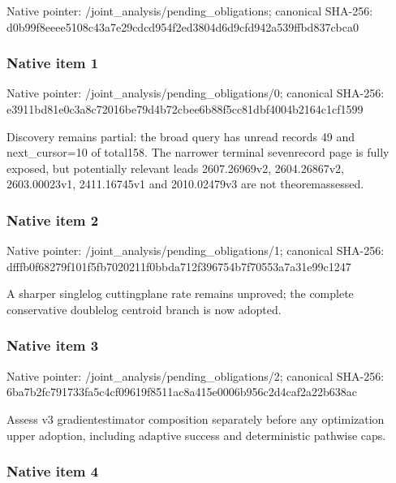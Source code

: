 \documentclass[10pt,a4paper]{article}
\begin{document}
Native pointer: /joint\_analysis/pending\_obligations; canonical SHA-256: d0b99f8eeee5108c43a7e29c\allowbreak{}dcd954f2ed3804d6d9cfd942\allowbreak{}a539ffbd837cbca0



\subsubsection{Native item 1}


Native pointer: /joint\_analysis/pending\_obligations/0; canonical SHA-256: e3911bd81e0c3a8c72016be7\allowbreak{}9d4b72cbee6b88f5cc81dbf4\allowbreak{}004b2164c1cf1599


Discovery remains partial: the broad query has unread records 49 and next\_cursor=10 of total158. The narrower terminal sevenrecord page is fully exposed, but potentially relevant leads 2607.26969v2, 2604.26867v2, 2603.00023v1, 2411.16745v1 and 2010.02479v3 are not theoremassessed.


\subsubsection{Native item 2}


Native pointer: /joint\_analysis/pending\_obligations/1; canonical SHA-256: dfffb0f68279f101f5fb7020\allowbreak{}211f0bbda712f396754b7f70\allowbreak{}553a7a31e99c1247


A sharper singlelog cuttingplane rate remains unproved; the complete conservative doublelog centroid branch is now adopted.


\subsubsection{Native item 3}


Native pointer: /joint\_analysis/pending\_obligations/2; canonical SHA-256: 6ba7b2fc791733fa5c4cf096\allowbreak{}19f8511ac8a415e0006b956c\allowbreak{}2d4caf2a22b638ac


Assess v3 gradientestimator composition separately before any optimization upper adoption, including adaptive success and deterministic pathwise caps.


\subsubsection{Native item 4}
\end{document}
